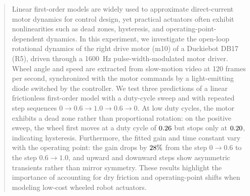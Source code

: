 \begin{abstract}
Linear first-order models are widely used to approximate direct-current motor dynamics for control design, yet practical actuators often exhibit nonlinearities such as dead zones, hysteresis, and operating-point-dependent dynamics. In this experiment, we investigate the open-loop rotational dynamics of the right drive motor (m10) of a Duckiebot DB17 (R5), driven through a 1600~Hz pulse-width-modulated motor driver. Wheel angle and speed are extracted from slow-motion video at 120 frames per second, synchronized with the motor commands by a light-emitting diode switched by the controller. We test three predictions of a linear frictionless first-order model with a duty-cycle sweep and with repeated step sequences $0 \to 0.6 \to 1.0 \to 0.6 \to 0$. At low duty cycles, the motor exhibits a dead zone rather than proportional rotation: on the positive sweep, the wheel first moves at a duty cycle of $\StartDuty$ but stops only at $\StopDuty$, indicating hysteresis. Furthermore, the fitted gain and time constant vary with the operating point: the gain drops by $\GainDrop\%$ from the step $0 \to 0.6$ to the step $0.6 \to 1.0$, and upward and downward steps show asymmetric transients rather than mirror symmetry. These results highlight the importance of accounting for dry friction and operating-point shifts when modeling low-cost wheeled robot actuators.
\end{abstract}

